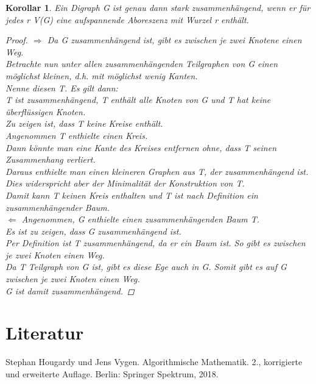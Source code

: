 \documentclass{article}
\newtheorem{korollar}[satz]{Korollar}
\begin{document}
  \begin{korollar}\lable
    Ein Digraph G ist genau dann stark zusammenhängend, wenn er für jedes r \in V(G) eine aufspannende Aboreszenz mit Wurzel r enthält.
    \begin{proof}
    $\Rightarrow$ Da G zusammenhängend ist, gibt es zwischen je zwei Knotene einen Weg.\\
      Betrachte nun unter allen zusammenhängenden Teilgraphen von G einen möglichst kleinen, d.h. mit möglichst wenig Kanten.\\
      Nenne diesen T. Es gilt dann:\\
     T ist zusammenhängend, T enthält alle Knoten von G und T hat keine überflüssigen Knoten.\\
      Zu zeigen ist, dass T keine Kreise enthält.\\
      Angenommen T enthielte einen Kreis.\\
      Dann könnte man eine Kante des Kreises entfernen ohne, dass T seinen Zusammenhang verliert.\\
      Daraus enthielte man einen kleineren Graphen aus T, der zusammenhängend ist. Dies widerspricht aber der Minimalität der Konstruktion von T.\\
      Damit kann T keinen Kreis enthalten und T ist nach Definition ein zusammenhängender Baum.\\
    $\Leftarrow$ Angenommen, G enthielte einen zusammenhängenden Baum T.\\
      Es ist zu zeigen, dass G zusammenhängend ist.\\
      Per Definition ist T zusammenhängend, da er ein Baum ist. So gibt es zwischen je zwei Knoten einen Weg.\\
      Da T Teilgraph von G ist, gibt es diese Ege auch in G. Somit gibt es auf G zwischen je zwei Knoten einen Weg.\\
      G ist damit zusammenhängend.
  \end{proof}
  \end{korollar}
\vspace{\baselineskip}
\newpage

\section{Literatur}
  Stephan Hougardy und Jens Vygen. Algorithmische Mathematik. 2., korrigierte und erweiterte Auflage. Berlin: Springer Spektrum, 2018.
\end{document}
